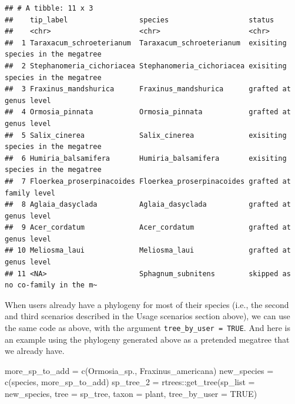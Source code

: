 \documentclass[
  12pt,
]{article}
\newenvironment{Shaded}{\begin{snugshade}}{\end{snugshade}}
\newcommand{\AttributeTok}[1]{\textcolor[rgb]{0.77,0.63,0.00}{#1}}
\newcommand{\ConstantTok}[1]{\textcolor[rgb]{0.00,0.00,0.00}{#1}}
\newcommand{\FunctionTok}[1]{\textcolor[rgb]{0.00,0.00,0.00}{#1}}
\newcommand{\NormalTok}[1]{#1}
\newcommand{\OtherTok}[1]{\textcolor[rgb]{0.56,0.35,0.01}{#1}}
\newcommand{\SpecialCharTok}[1]{\textcolor[rgb]{0.00,0.00,0.00}{#1}}
\newcommand{\StringTok}[1]{\textcolor[rgb]{0.31,0.60,0.02}{#1}}
\begin{document}
\begin{verbatim}
## # A tibble: 11 x 3
##    tip_label                 species                   status                           
##    <chr>                     <chr>                     <chr>                            
##  1 Taraxacum_schroeterianum  Taraxacum_schroeterianum  exisiting species in the megatree
##  2 Stephanomeria_cichoriacea Stephanomeria_cichoriacea exisiting species in the megatree
##  3 Fraxinus_mandshurica      Fraxinus_mandshurica      grafted at genus level           
##  4 Ormosia_pinnata           Ormosia_pinnata           grafted at genus level           
##  5 Salix_cinerea             Salix_cinerea             exisiting species in the megatree
##  6 Humiria_balsamifera       Humiria_balsamifera       exisiting species in the megatree
##  7 Floerkea_proserpinacoides Floerkea_proserpinacoides grafted at family level          
##  8 Aglaia_dasyclada          Aglaia_dasyclada          grafted at genus level           
##  9 Acer_cordatum             Acer_cordatum             grafted at genus level           
## 10 Meliosma_laui             Meliosma_laui             grafted at genus level           
## 11 <NA>                      Sphagnum_subnitens        skipped as no co-family in the m~
\end{verbatim}

When users already have a phylogeny for most of their species (i.e., the second and third scenarios described in the Usage scenarios section above), we can use the same code as above, with the argument \texttt{tree\_by\_user\ =\ TRUE}. And here is an example using the phylogeny generated above as a pretended megatree that we already have.

\begin{Shaded}
\begin{Highlighting}[]
\NormalTok{more\_sp\_to\_add }\OtherTok{=} \FunctionTok{c}\NormalTok{(}\StringTok{\textquotesingle{}Ormosia\_sp.\textquotesingle{}}\NormalTok{, }\StringTok{\textquotesingle{}Fraxinus\_americana\textquotesingle{}}\NormalTok{)}
\NormalTok{new\_species }\OtherTok{=} \FunctionTok{c}\NormalTok{(species, more\_sp\_to\_add)}
\NormalTok{sp\_tree\_2 }\OtherTok{=}\NormalTok{ rtrees}\SpecialCharTok{::}\FunctionTok{get\_tree}\NormalTok{(}\AttributeTok{sp\_list =}\NormalTok{ new\_species, }\AttributeTok{tree =}\NormalTok{ sp\_tree, }
                             \AttributeTok{taxon =} \StringTok{\textquotesingle{}plant\textquotesingle{}}\NormalTok{, }\AttributeTok{tree\_by\_user =} \ConstantTok{TRUE}\NormalTok{)}
\end{Highlighting}
\end{Shaded}
\end{document}
